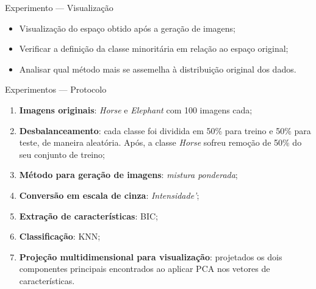 \documentclass{beamer}
\begin{document}
%
\begin{frame}{Experimento --- Visualização}
  \setlength\leftmargini{1em}
  \begin{itemize}
  \item Visualização do espaço obtido após a geração de imagens;
  \item Verificar a definição da classe minoritária em relação ao espaço original;
  \item Analisar qual método mais se assemelha à distribuição original dos dados.
  \end{itemize}
\end{frame}
\begin{frame}{Experimentos --- Protocolo}
  \setlength\leftmargini{1em}
  \begin{block}{}
    \justifying
    \begin{enumerate}
    \item \textbf{Imagens originais}: \emph{Horse} e \emph{Elephant} com 100 imagens cada;
    \item \textbf{Desbalanceamento}: cada classe foi dividida em 50\% para treino e 50\% para teste, de maneira aleatória. Após, a classe \emph{Horse} sofreu remoção de 50\% do seu conjunto de treino;
    \item \textbf{Método para geração de imagens}: \emph{mistura ponderada};
    \item \textbf{Conversão em escala de cinza}: \emph{Intensidade'};
    \item \textbf{Extração de características}: BIC;
    \item \textbf{Classificação}: KNN;
    \item \textbf{Projeção multidimensional para visualização}: projetados os dois componentes principais encontrados ao aplicar PCA nos vetores de características.
    \end{enumerate}
  \end{block}
\end{frame}
\end{document}
